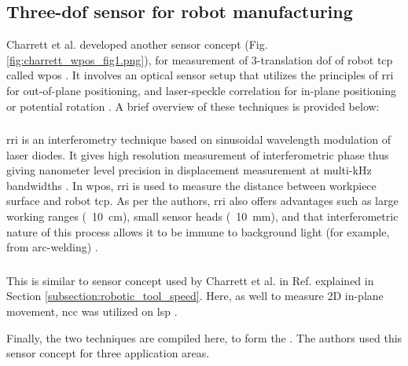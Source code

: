     \subsection{Three-\gls{dof} sensor for robot manufacturing}
        Charrett et al. developed another sensor concept (Fig. \ref{fig:charrett_wpos_fig1.png}), for measurement of 3-translation \gls{dof} of robot \gls{tcp} called \gls{wpos} \cite{charrett_wpos}. It involves an optical sensor setup that utilizes the principles of \gls{rri} \cite{kissinger_rri} for out-of-plane positioning, and laser-speckle correlation for in-plane positioning or potential rotation \cite{charrett_2019}. A brief overview of these techniques is provided below:

        \subsubsection{}
            \gls{rri} is an interferometry technique based on sinusoidal wavelength modulation of laser diodes. It gives high resolution measurement of interferometric phase thus giving nanometer level precision in displacement measurement at multi-kHz bandwidths \cite{kissinger_rri}. In \gls{wpos}, \gls{rri} is used to measure the distance between workpiece surface and robot \gls{tcp}. As per the authors, \gls{rri} also offers advantages such as large working ranges (\geq\ \SI{10}{\centi\meter}), small sensor heads (\leq\ \SI{10}{\milli\meter}), and that interferometric nature of this process allows it to be immune to background light (for example, from arc-welding) \cite{kissinger_rri}.

        \subsubsection{}
            This is similar to sensor concept used by Charrett et al. in Ref. \cite{charrett_2018} explained in Section \ref{subsection:robotic_tool_speed}. Here, as well to measure 2D in-plane movement, \gls{ncc} was utilized on \gls{lsp} \cite{charrett_wpos}.

        \vspace{5mm}
        \noindent Finally, the two techniques are compiled here, to form the . The authors used this sensor concept for three application areas.
        
